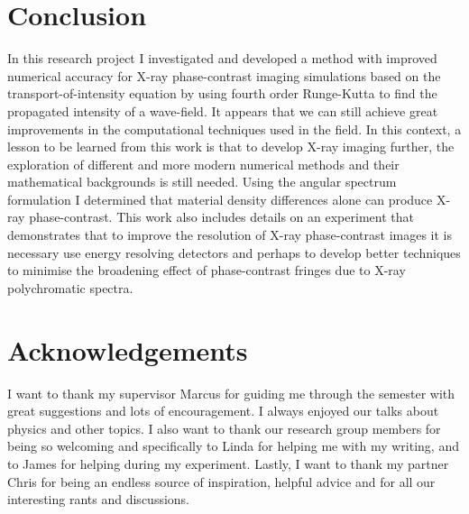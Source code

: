 \documentclass[10pt, a4paper, singlespacing]{report}
\begin{document}


\chapter{Conclusion}\label{Conclusion}

In this research project I investigated and developed a method with improved numerical accuracy for X-ray phase-contrast imaging simulations based on the transport-of-intensity equation by using fourth order Runge-Kutta to find the propagated intensity of a wave-field. It appears that we can still achieve great improvements in the computational techniques used in the field. In this context, a lesson to be learned from this work is that to develop X-ray imaging further, the exploration of different and more modern numerical methods and their mathematical backgrounds is still needed.
Using the angular spectrum formulation I determined that material density differences alone can produce X-ray phase-contrast. This work also includes details on an experiment that demonstrates that to improve the resolution of X-ray phase-contrast images it is necessary use energy resolving detectors and perhaps to develop better techniques to minimise the broadening effect of phase-contrast fringes due to X-ray polychromatic spectra. 


\chapter{Acknowledgements}\label{Acknowledgements}

I want to thank my supervisor Marcus for guiding me through the semester with great suggestions and lots of encouragement. I always enjoyed our talks about physics and other topics. I also want to thank our research group members for being so welcoming and specifically to Linda for helping me with my writing, and to James for helping during my experiment. Lastly, I want to thank my partner Chris for being an endless source of inspiration, helpful advice and for all our interesting rants and discussions.  




\end{document}
